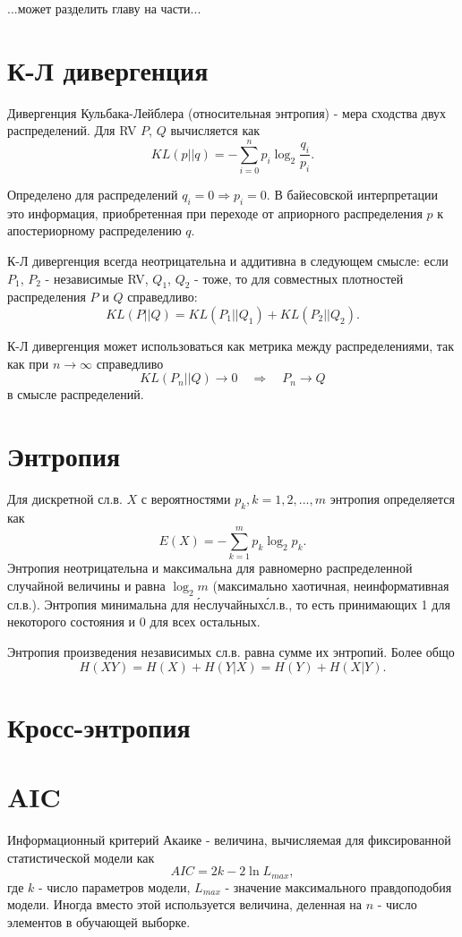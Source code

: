 ...может разделить главу на части...


\section{К-Л дивергенция}

Дивергенция Кульбака-Лейблера (относительная энтропия) - мера сходства двух распределений. Для RV $P$, $Q$ вычисляется как
$$
KL(p||q) = -\sum_{i=0}^np_i\log_2\frac{q_i}{p_i}.
$$

Определено для распределений $q_i = 0 \Rightarrow p_i=0$.
В байесовской интерпретации это информация, приобретенная при переходе от априорного распределения $p$ к апостериорному распределению $q$.

К-Л дивергенция всегда неотрицательна и аддитивна в следующем смысле: если $P_1$, $P_2$ - независимые RV, $Q_1$, $Q_2$ - тоже, то для совместных плотностей распределения $P$ и $Q$ справедливо:
$$
KL(P||Q) =  KL(P_1||Q_1) + KL(P_2||Q_2).
$$

К-Л дивергенция может использоваться как метрика между распределениями, так как при $n \rightarrow \infty$ справедливо
$$
KL(P_n||Q) \rightarrow 0 \quad \Rightarrow \quad P_n \rightarrow Q
$$
в смысле распределений.

\section{Энтропия}

Для дискретной сл.в. $X$ с вероятностями $p_k, k=1, 2, ..., m$ энтропия определяется как
$$
E(X) = -\sum_{k=1}^mp_k\log_2p_k.
$$
Энтропия неотрицательна и максимальна для равномерно распределенной случайной величины и равна $\log_2m$ (максимально хаотичная, неинформативная сл.в.). Энтропия минимальна для \'неслучайных\' сл.в., то есть принимающих 1 для некоторого состояния и 0 для всех остальных.

Энтропия произведения независимых сл.в. равна сумме их энтропий. Более общо
$$
H(XY) = H(X) + H(Y|X) = H(Y) + H(X|Y).
$$


\section{Кросс-энтропия}


\section{AIC}

Информационный критерий Акаике - величина, вычисляемая для фиксированной статистической модели как
$$
AIC = 2k - 2\ln L_{max},
$$
где $k$ - число параметров модели, $L_{max}$ - значение максимального правдоподобия модели. Иногда вместо этой используется величина, деленная на $n$ - число элементов в обучающей выборке.

